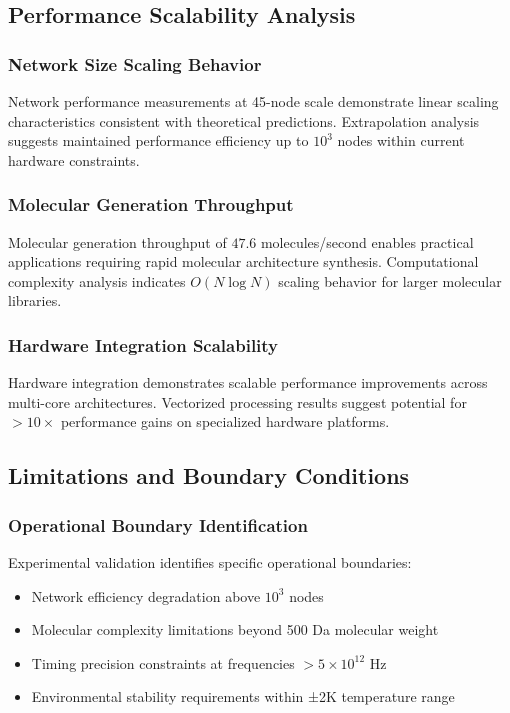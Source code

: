 \subsection{Performance Scalability Analysis}

\subsubsection{Network Size Scaling Behavior}

Network performance measurements at 45-node scale demonstrate linear scaling characteristics consistent with theoretical predictions. Extrapolation analysis suggests maintained performance efficiency up to $10^3$ nodes within current hardware constraints.

\subsubsection{Molecular Generation Throughput}

Molecular generation throughput of $47.6$ molecules/second enables practical applications requiring rapid molecular architecture synthesis. Computational complexity analysis indicates $O(N \log N)$ scaling behavior for larger molecular libraries.

\subsubsection{Hardware Integration Scalability}

Hardware integration demonstrates scalable performance improvements across multi-core architectures. Vectorized processing results suggest potential for $> 10 \times$ performance gains on specialized hardware platforms.

\subsection{Limitations and Boundary Conditions}

\subsubsection{Operational Boundary Identification}

Experimental validation identifies specific operational boundaries:

\begin{itemize}
\item Network efficiency degradation above $10^3$ nodes
\item Molecular complexity limitations beyond 500 Da molecular weight  
\item Timing precision constraints at frequencies $> 5 \times 10^{12}$ Hz
\item Environmental stability requirements within ±2K temperature range
\end{itemize}

